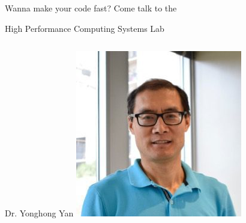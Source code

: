 \documentclass[aspectratio=169]{beamer}
\date{}
\begin{document}
\begin{frame}
  

  Wanna make your code fast? Come talk to the

  \vspace{3em}

  
  {\LARGE High Performance Computing Systems Lab}

  \vspace{3em}


  
  \begin{columns}
    Dr. Yonghong Yan
    \includegraphics[trim={4em 0 4em 0}, clip, width=.9\linewidth]{pics/Yan.jpg}


\end{columns}
\end{frame}
\end{document}
